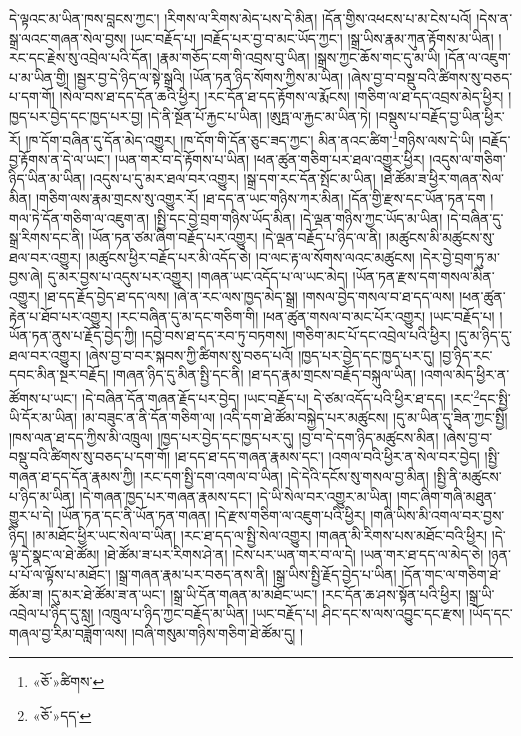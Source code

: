 དེ་ལྟའང་མ་ཡིན་ཁས་བླངས་ཀྱང་། །རིགས་ལ་རིགས་མེད་པས་དེ་མིན། །དོན་གྱིས་འཕངས་པ་མ་ངེས་པའོ། །དེས་ན་སྒྲ་ལའང་གཞན་སེལ་བྱས། །ཡང་བརྗོད་པ། །བརྗོད་པར་བྱ་བ་མང་ཡོད་ཀྱང་། །སྒྲ་ཡིས་རྣམ་ཀུན་རྟོགས་མ་ཡིན། །རང་དང་རྗེས་སུ་འབྲེལ་པའི་དོན། །རྣམ་གཅོད་ངག་གི་འབྲས་བུ་ཡིན། །སྒྲས་ཀྱང་ཆོས་གང་དུ་མ་ཡི། །དོན་ལ་འཇུག་པ་མ་ཡིན་གྱི། །སྦྱར་བྱ་དེ་ཉིད་ལ་སྟེ་སྒྲའི། །ཡོན་ཏན་ཉིད་སོགས་ཀྱིས་མ་ཡིན། །ཞེས་བྱ་བ་བསྡུ་བའི་ཚིགས་སུ་བཅད་པ་དག་གོ། །སེལ་བས་ཐ་དད་དོན་ཆའི་ཕྱིར། །རང་དོན་ཐ་དད་རྟོགས་ལ་རྨོངས། །གཅིག་ལ་ཐ་དད་འབྲས་མེད་ཕྱིར། །ཁྱད་པར་བྱེད་དང་ཁྱད་པར་བྱ། །དེ་ནི་སྔོན་པོ་རྐྱང་པ་ཡིན། །ཨུཏྤ་ལ་རྐྱང་མ་ཡིན་ཏེ། །བསྡུས་པ་བརྗོད་བྱ་ཡིན་ཕྱིར་རོ། །ཁ་དོག་བཞིན་དུ་དོན་མེད་འགྱུར། །ཁ་དོག་གི་དོན་ཅུང་ཟད་ཀྱང་། མིན་ནའང་ཚིག་\footnote{«ཅོ་»ཚིགས་}གཉིས་ལས་དེ་ཡི། །བརྗོད་བྱ་རྟོགས་ན་དེ་ལ་ཡང་། །ཡན་གར་བ་དེ་རྟོགས་པ་ཡིན། །ཕན་ཚུན་གཅིག་པར་ཐལ་འགྱུར་ཕྱིར། །འདུས་ལ་གཅིག་ཉིད་ཡིན་མ་ཡིན། །འདུས་པ་དུ་མར་ཐལ་བར་འགྱུར། །སྒྲ་དག་རང་དོན་སྤོང་མ་ཡིན། །ཐེ་ཚོམ་ཟ་ཕྱིར་གཞན་སེལ་མིན། །གཅིག་ལས་རྣམ་གྲངས་སུ་འགྱུར་རོ། །ཐ་དད་ན་ཡང་གཉིས་ཀར་མིན། །དོན་གྱི་རྫས་དང་ཡོན་ཏན་དག །གལ་ཏེ་དོན་གཅིག་ལ་འཇུག་ན། །སྤྱི་དང་བྱེ་བྲག་གཉིས་ཡོད་མིན། །དེ་ལྡན་གཉིས་ཀྱང་ཡོད་མ་ཡིན། །དེ་བཞིན་དུ་སྒྲ་རིགས་དང་ནི། །ཡོན་ཏན་ཙམ་ཞིག་བརྗོད་པར་འགྱུར། །དེ་ལྡན་བརྗོད་པ་ཉིད་ལ་ནི། །མཚུངས་མི་མཚུངས་སུ་ཐལ་བར་འགྱུར། །མཚུངས་ཕྱིར་བརྗོད་པར་མི་འདོད་ཅེ། །བ་ལང་རྟ་ལ་སོགས་ལའང་མཚུངས། །དེར་བྱེ་བྲག་ཏུ་མ་བྱས་ཞེ། དུ་མར་བྱས་པ་འདུས་པར་འགྱུར། །གཞན་ཡང་འདོད་པ་ལ་ཡང་མེད། །ཡོན་ཏན་རྫས་དག་གསལ་མིན་འགྱུར། །ཐ་དད་རྗོད་བྱེད་ཐ་དད་ལས། །ཞེ་ན་རང་ལས་ཁྱད་མེད་སྒྲ། །གསལ་བྱེད་གསལ་བ་ཐ་དད་ལས། །ཕན་ཚུན་རྟེན་པ་ཐོབ་པར་འགྱུར། །རང་བཞིན་དུ་མ་དང་གཅིག་གི། །ཕན་ཚུན་གསལ་བ་མང་པོར་འགྱུར། །ཡང་བརྗོད་པ། །
ཡོན་ཏན་ནུས་པ་རྗོད་བྱེད་ཀྱི། །དབྱེ་བས་ཐ་དད་རབ་ཏུ་བཏགས། །གཅིག་མང་པོ་དང་འབྲེལ་པའི་ཕྱིར། །དུ་མ་ཉིད་དུ་ཐལ་བར་འགྱུར། །ཞེས་བྱ་བ་བར་སྐབས་ཀྱི་ཚིགས་སུ་བཅད་པའོ། །ཁྱད་པར་བྱེད་དང་ཁྱད་པར་དུ། །བྱ་ཉིད་རང་དབང་མིན་སྔར་བརྗོད། །གཞན་ཉིད་དུ་མིན་སྤྱི་དང་ནི། །ཐ་དད་རྣམ་གྲངས་བརྗོད་བསྐུལ་ཡིན། །འགལ་མེད་ཕྱིར་ན་ཚོགས་པ་ཡང་། །དེ་བཞིན་དོན་གཞན་རྗོད་པར་བྱེད། །ཡང་བརྗོད་པ། དེ་ཙམ་འདོད་པའི་ཕྱིར་ཐ་དད། །རང་\footnote{«ཅོ་»དད་}དང་སྤྱི་ཡི་དོར་མ་ཡིན། །མ་བཟུང་ན་ནི་དོན་གཅིག་ལ། །འདི་དག་ཐེ་ཚོམ་བསྐྱེད་པར་མཚུངས། །དུ་མ་ཡིན་དུ་ཟིན་ཀྱང་སྤྱི། །ཁས་ལན་ཐ་དད་ཀྱིས་མི་འཁྲུལ། །ཁྱད་པར་བྱེད་དང་ཁྱད་པར་དུ། །བྱ་བ་དེ་དག་ཉིད་མཚུངས་མིན། །ཞེས་བྱ་བ་བསྡུ་བའི་ཚིགས་སུ་བཅད་པ་དག་གོ། །ཐ་དད་ཐ་དད་གཞན་རྣམས་དང་། །འགལ་བའི་ཕྱིར་ན་སེལ་བར་བྱེད། །སྤྱི་གཞན་ཐ་དད་དོན་རྣམས་ཀྱི། །རང་དག་སྤྱི་དག་འགལ་བ་ཡིན། །དེ་དེའི་དངོས་སུ་གསལ་བྱ་མིན། །སྤྱི་ནི་མཚུངས་པ་ཉིད་མ་ཡིན། །དེ་གཞན་ཁྱད་པར་གཞན་རྣམས་དང་། །དེ་ཡི་སེལ་བར་འགྱུར་མ་ཡིན། །གང་ཞིག་གཞི་མཐུན་གྱུར་པ་དེ། །ཡོན་ཏན་དང་ནི་ཡོན་ཏན་གཞན། །དེ་རྫས་གཅིག་ལ་འཇུག་པའི་ཕྱིར། །གཞི་ཡིས་མི་འགལ་བར་བྱས་ཉིད། །མ་མཐོང་ཕྱིར་ཡང་སེལ་བ་ཡིན། །རང་ཐ་དད་ལ་སྤྱི་སེལ་འགྱུར། །གཞན་མི་རིགས་པས་མཐོང་བའི་ཕྱིར། །དེ་ལྟ་དེ་སྣང་ལ་ཐེ་ཚོམ། །ཐེ་ཚོམ་ཟ་པར་རིགས་ཤེ་ན། །ངེས་པར་ཡན་གར་བ་ལ་དེ། །ཡན་གར་ཐ་དད་ལ་མེད་ཅེ། །ཉན་པ་པོ་ལ་ལྟོས་པ་མཐོང་། །སྒྲ་གཞན་རྣམ་པར་བཅད་ནས་ནི། །སྒྲ་ཡིས་སྤྱི་རྗོད་བྱེད་པ་ཡིན། །དོན་གང་ལ་གཅིག་ཐེ་ཚོམ་ཟ། །དུ་མར་ཐེ་ཚོམ་ཟ་ན་ཡང་། །སྒྲ་ཡི་དོན་གཞན་མ་མཐོང་ཡང་། །རང་དོན་ཆ་ཤས་སྟོན་པའི་ཕྱིར། །སྒྲ་ཡི་འབྲེལ་པ་ཉིད་དུ་སླ། །འཁྲུལ་པ་ཉིད་ཀྱང་བརྗོད་མ་ཡིན། །ཡང་བརྗོད་པ། ཤིང་དང་ས་ལས་འབྱུང་དང་རྫས། །ཡོད་དང་གཞལ་བྱ་རིམ་བཟློག་ལས། །བཞི་གསུམ་གཉིས་གཅིག་ཐེ་ཚོམ་དུ། །
